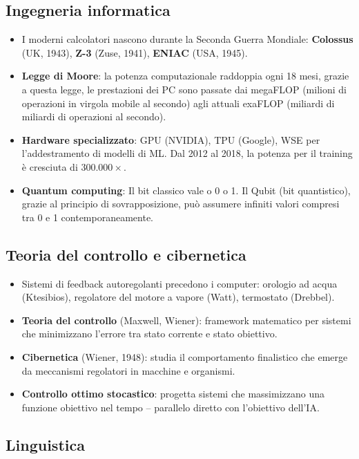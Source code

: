 \subsection{Ingegneria informatica}
\begin{itemize}
    \item I moderni calcolatori nascono durante la Seconda Guerra Mondiale: \textbf{Colossus} (UK, 1943), \textbf{Z-3} (Zuse, 1941), \textbf{ENIAC} (USA, 1945).
    \item \textbf{Legge di Moore}: la potenza computazionale raddoppia ogni 18 mesi, grazie a questa legge, le prestazioni dei PC sono passate dai megaFLOP (milioni di operazioni in virgola mobile al secondo) agli attuali exaFLOP (miliardi di miliardi di operazioni al secondo).
    \item \textbf{Hardware specializzato}: GPU (NVIDIA), TPU (Google), WSE per l'addestramento di modelli di ML. Dal 2012 al 2018, la potenza per il training \`e cresciuta di $300.000\times$.
    \item \textbf{Quantum computing}: Il bit classico vale o 0 o 1. Il Qubit (bit quantistico), grazie al principio di sovrapposizione, può assumere infiniti valori compresi tra 0 e 1 contemporaneamente.
\end{itemize}


\subsection{Teoria del controllo e cibernetica}
\begin{itemize}
    \item Sistemi di feedback autoregolanti precedono i computer: orologio ad acqua (Ktesibios), regolatore del motore a vapore (Watt), termostato (Drebbel).
    \item \textbf{Teoria del controllo} (Maxwell, Wiener): framework matematico per sistemi che minimizzano l'errore tra stato corrente e stato obiettivo. 
    \item \textbf{Cibernetica} (Wiener, 1948): studia il comportamento finalistico che emerge da meccanismi regolatori in macchine e organismi.
    \item \textbf{Controllo ottimo stocastico}: progetta sistemi che massimizzano una funzione obiettivo nel tempo -- parallelo diretto con l'obiettivo dell'IA.
\end{itemize}


\subsection{Linguistica}


